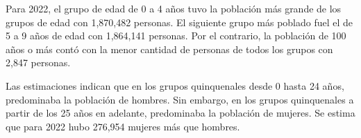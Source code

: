 \justifying Para 2022, el grupo de edad de 0 a 4 años tuvo la población más grande de los grupos de edad con 1,870,482 personas. El siguiente grupo más poblado fuel el de 5 a 9 años de edad con 1,864,141 personas. Por el contrario,  la población de 100 años o más contó con la menor cantidad de personas de todos los grupos con 2,847 personas. 

Las estimaciones indican que en los grupos quinquenales desde 0 hasta 24 años, predominaba la población de hombres. Sin embargo, en los grupos quinquenales a partir de los 25 años en adelante, predominaba la población de mujeres. Se estima que para 2022 hubo 276,954 mujeres más que hombres.
